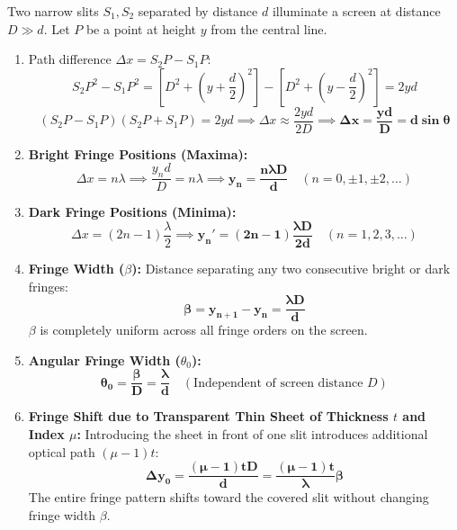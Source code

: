 \documentclass[10pt,a4paper]{article}
\begin{document}
\begin{formulabox}
Two narrow slits $S_1, S_2$ separated by distance $d$ illuminate a screen at distance $D \gg d$. Let $P$ be a point at height $y$ from the central line.
\begin{enumerate}
  \item Path difference $\Delta x = S_2 P - S_1 P$:
  \begin{equation}
    S_2 P^2 - S_1 P^2 = \left[D^2 + \left(y + \frac{d}{2}\right)^2\right] - \left[D^2 + \left(y - \frac{d}{2}\right)^2\right] = 2yd
  \end{equation}
  \begin{equation}
    (S_2 P - S_1 P)(S_2 P + S_1 P) = 2yd \implies \Delta x \approx \frac{2yd}{2D} \implies \mathbf{\Delta x = \frac{yd}{D} = d\sin\theta}
  \end{equation}
  \item \textbf{Bright Fringe Positions (Maxima):}
  \begin{equation}
    \Delta x = n\lambda \implies \frac{y_n d}{D} = n\lambda \implies \mathbf{y_n = \frac{n\lambda D}{d}} \quad (n = 0, \pm 1, \pm 2, \dots)
  \end{equation}
  \item \textbf{Dark Fringe Positions (Minima):}
  \begin{equation}
    \Delta x = (2n-1)\frac{\lambda}{2} \implies \mathbf{y_n' = (2n-1)\frac{\lambda D}{2d}} \quad (n = 1, 2, 3, \dots)
  \end{equation}
  \item \textbf{Fringe Width ($\beta$):} Distance separating any two consecutive bright or dark fringes:
  \begin{equation}
    \mathbf{\beta = y_{n+1} - y_n = \frac{\lambda D}{d}}
  \end{equation}
  $\beta$ is completely uniform across all fringe orders on the screen.
  \item \textbf{Angular Fringe Width ($\theta_0$):}
  \begin{equation}
    \mathbf{\theta_0 = \frac{\beta}{D} = \frac{\lambda}{d}} \quad (\text{Independent of screen distance } D)
  \end{equation}
  \item \textbf{Fringe Shift due to Transparent Thin Sheet of Thickness $t$ and Index $\mu$:}
  Introducing the sheet in front of one slit introduces additional optical path $(\mu - 1)t$:
  \begin{equation}
    \mathbf{\Delta y_0 = \frac{(\mu - 1)t D}{d} = \frac{(\mu - 1)t}{\lambda}\beta}
  \end{equation}
  The entire fringe pattern shifts toward the covered slit without changing fringe width $\beta$.
\end{enumerate}
\end{formulabox}
\end{document}
